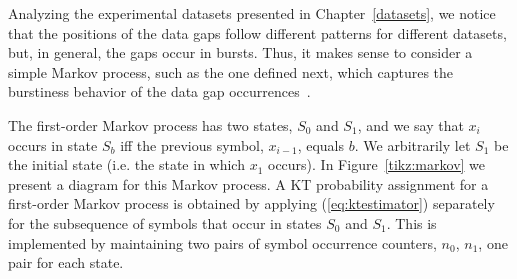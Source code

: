 \clearpage


Analyzing the experimental datasets presented in Chapter~\ref{datasets}, we notice that the positions of the data gaps follow different patterns for different datasets, but, in general, the gaps occur in bursts. Thus, it makes sense to consider a simple Markov process, such as the one defined next, which captures the burstiness behavior of the data gap occurrences~\cite{markovBurst}.


\begin{table}[h]
\begin{minipage}{0.62\textwidth}
The first-order Markov process has two states, $S_0$ and $S_1$, and we say that $x_i$ occurs in state $S_b$ iff the previous symbol, $x_{i-1}$, equals $b$. We arbitrarily let $S_1$ be the initial state (i.e. the state in which $x_1$ occurs). In Figure~\ref{tikz:markov} we present a diagram for this Markov process. A KT probability assignment for a first-order Markov process is obtained by applying (\ref{eq:ktestimator}) separately for the subsequence of symbols that occur in states $S_0$ and $S_1$. This is implemented by maintaining two pairs of symbol occurrence counters, $n_0$, $n_1$, one pair for each state.

\end{minipage}
\hspace{0.02\textwidth}
\begin{minipage}{0.32\textwidth}

\end{minipage}
\end{table}

